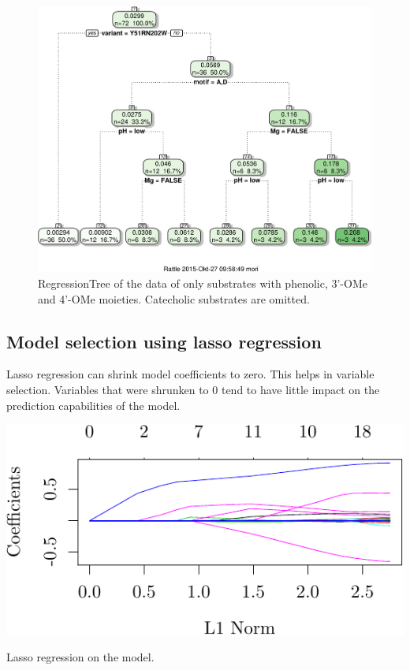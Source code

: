 \documentclass[]{tufte-handout}
\begin{document}
\begin{figure}
 \includegraphics{tufte_files/figure-latex/regression_tree-1.pdf}
\caption{RegressionTree of the data of only substrates with phenolic, 3'-OMe and 4'-OMe moieties. Catecholic substrates are omitted.}
\end{figure}

\subsection{Model selection using lasso
regression}\label{model-selection-using-lasso-regression}

Lasso regression can shrink model coefficients to zero. This helps in
variable selection. Variables that were shrunken to 0 tend to have
little impact on the prediction capabilities of the model.

\begin{marginfigure}
 \includegraphics{tufte_files/figure-latex/lasso_sparse_matrix-1.pdf}
\caption{Lasso regression on the model.}
\end{marginfigure}
\end{document}
